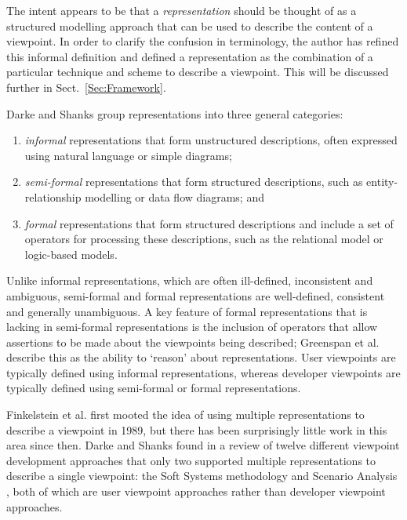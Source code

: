 \documentclass[11pt,oribibl]{llncs}
\begin{document}
The intent appears to be that a \emph{representation} should be thought of as a structured modelling approach that can be used to describe the content of a viewpoint. In order to clarify the confusion in terminology, the author has refined this informal definition and defined a representation as the combination of a particular technique and scheme to describe a viewpoint. This will be discussed further in Sect.~\ref{Sec:Framework}.

Darke and Shanks \cite{Dark:P:1995} group representations into three general categories:
\begin{enumerate}
	\item \emph{informal} representations that form unstructured descriptions, often expressed using natural language or simple diagrams;
	\item \emph{semi-formal} representations that form structured descriptions, such as entity-re\-la\-tion\-ship modelling or data flow diagrams; and
	\item \emph{formal} representations that form structured descriptions and include a set of operators for processing these descriptions, such as the relational model or logic-based models.
\end{enumerate}

Unlike informal representations, which are often ill-defined, inconsistent and ambiguous, semi-formal and formal representations are well-defined, consistent and generally unambiguous. A key feature of formal representations that is lacking in semi-formal representations is the inclusion of operators that allow assertions to be made about the viewpoints being described; Greenspan et al. \cite{Gree:S:1994:RML} describe this as the ability to `reason' about representations. User viewpoints are typically defined using informal representations, whereas developer viewpoints are typically defined using semi-formal or formal representations.

Finkelstein et al. \cite{Fink:ACW:1989} first mooted the idea of using multiple representations to describe a viewpoint in 1989, but there has been surprisingly little work in this area since then. Darke and Shanks \cite{Dark:P:1996:RE} found in a review of twelve different viewpoint development approaches that only two supported multiple representations to describe a single viewpoint: the Soft Systems methodology \cite{Chec:PB:1981:SSM} and Scenario Analysis \cite{Hsia:P:1994:Scenario}, both of which are user viewpoint approaches rather than developer viewpoint approaches.
\end{document}
